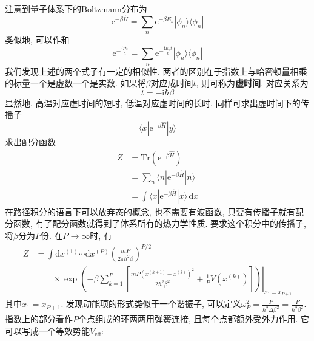         注意到量子体系下的Boltzmann分布为
        \begin{equation}
            \mathrm{e}^{-\beta \hat{H}} = \sum_n \mathrm{e}^{-\beta E_n} |\phi_n \rangle \langle \phi_n|
        \end{equation}
        类似地, 可以作和
        \begin{equation}
            \mathrm{e}^{-\frac {\mathrm{i}\hat{H}t}{\hbar}} = \sum_n \mathrm{e}^{-\frac {\mathrm{i}E_n t}{\hbar}} |\phi_n \rangle \langle \phi_n|
        \end{equation}
        我们发现上述的两个式子有一定的相似性. 两者的区别在于指数上与哈密顿量相乘的标量一个是虚数一个是实数. 如果将$\beta$对应成时间$t$, 则可称为\textbf{虚时间}. 对应关系为
        \begin{equation}
            t = -\mathrm{i}\hbar \beta
        \end{equation}
        显然地, 高温对应虚时间的短时, 低温对应虚时间的长时. 同样可求出虚时间下的传播子
        \begin{equation}
            \langle x|\mathrm{e}^{-\beta \hat{H}}|y\rangle
        \end{equation}
        求出配分函数
        \begin{equation}\begin{aligned}
            Z &= \mathrm{Tr}(\mathrm{e}^{-\beta \hat{H}}) \\
            &= \sum_n \langle n| \mathrm{e}^{-\beta \hat{H}}|n\rangle \\
            &= \int \langle x|\mathrm{e}^{-\beta \hat{H}}|x\rangle \,\mathrm{d}x
        \end{aligned}\end{equation}
        在路径积分的语言下可以放弃态的概念, 也不需要有波函数, 只要有传播子就有配分函数, 有了配分函数就得到了体系所有的热力学性质. 要求这个积分中的传播子, 将$\beta$分为$P$份. 在$P \to \infty$时, 有
        \begin{equation}\begin{aligned}
            Z &= \int \mathrm{d} x^{(1)} \cdots \mathrm{d} x^{(P)} \left(\frac{mP}{2\pi \hbar^2 \beta}\right)^{P/2} \\ & \qquad\times\left.
            \exp\left( -\beta \sum_{k=1}^{P} \left[\frac{mP(x^{(k+1)}-x^{(k)})^2}{2\hbar^2 \beta^2}+\frac{1}{P}V(x^{(k)})\right]\right)\right|_{x_1 = x_{P+1}}
        \end{aligned}\end{equation}
        其中$x_1 = x_{P+1}$. 发现动能项的形式类似于一个谐振子, 可以定义$\omega_P^2 = \frac P{\hbar^2 \Delta \beta^2} = \frac P{\hbar^2 \beta^2}$. 指数上的部分看作$P$个点组成的环两两用弹簧连接, 且每个点都额外受外力作用. 它可以写成一个等效势能$V_\mathrm{eff}$:
